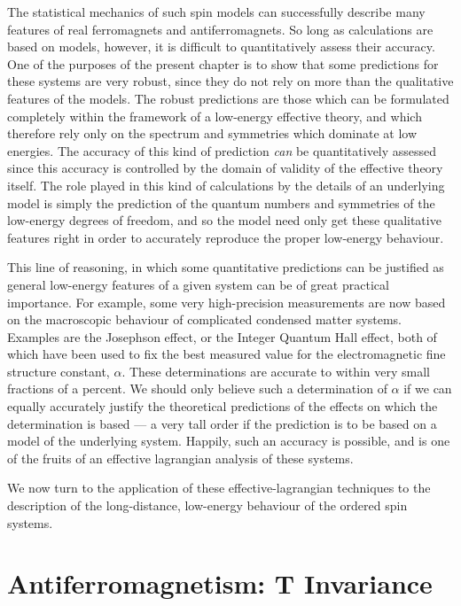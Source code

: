 \documentclass[12pt,epsf]{report}
\begin{document}
The statistical mechanics of such spin models can
successfully describe many features of real ferromagnets
and antiferromagnets. So long as calculations are based on
models, however, it is difficult to quantitatively assess
their accuracy. One of the purposes of the present chapter
is to show that some predictions for these systems are very
robust, since they do not rely on more than the qualitative
features of the models. The robust predictions are those
which can be formulated completely within the framework of
a low-energy effective theory, and which therefore rely
only on the spectrum and symmetries which dominate at low
energies. The accuracy of this kind of prediction {\em can}
be quantitatively assessed since this accuracy is controlled
by the domain of validity of the effective theory itself.
The role played in this kind of calculations by the details
of an underlying model is simply the prediction of the
quantum numbers and symmetries of the low-energy degrees of
freedom, and so the model need only get these qualitative
features right in order to accurately reproduce the proper
low-energy behaviour.

This line of reasoning, in which some quantitative
predictions can be justified as general low-energy features
of a given system can be of great practical importance. For
example, some very high-precision measurements are now
based on the macroscopic behaviour of complicated condensed
matter systems. Examples are the Josephson effect, or the
Integer Quantum Hall effect, both of which have been used
to fix the best measured value for the electromagnetic fine
structure constant, $\alpha$. These determinations are
accurate to within very small fractions of a percent. We
should only believe such a determination of $\alpha$ if we can
equally accurately justify the theoretical predictions of
the effects on which the determination is based --- a very
tall order if the prediction is to be based on a model of
the underlying system. Happily, such an accuracy is
possible, and is one of the fruits of an effective
lagrangian analysis of these systems.

We now turn to the application of these
effective-lagrangian techniques to the description of the
long-distance, low-energy behaviour of the ordered spin
systems.

\section{Antiferromagnetism: T Invariance}
\end{document}
